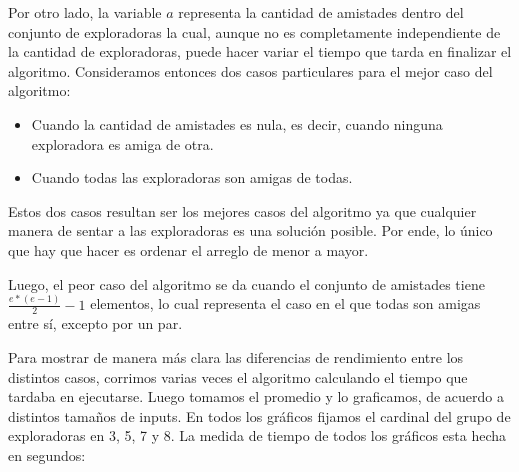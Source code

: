 \documentclass[11pt]{article}
\begin{document}
Por otro lado, la variable $a$ representa la cantidad de amistades dentro del conjunto de exploradoras la cual, 
aunque no es completamente independiente de la cantidad de exploradoras, puede hacer variar el tiempo que tarda 
en finalizar el algoritmo. Consideramos entonces dos casos particulares para el mejor caso del algoritmo:
\begin{itemize}
  \item Cuando la cantidad de amistades es nula, es decir, cuando ninguna exploradora es amiga de otra.
  \item Cuando todas las exploradoras son amigas de todas.
\end{itemize}
Estos dos casos resultan ser los mejores casos del algoritmo ya que cualquier manera de sentar a las exploradoras 
es una solución posible. Por ende, lo único que hay que hacer es ordenar el arreglo de menor a mayor. 

Luego, el peor caso del algoritmo se da cuando el conjunto de amistades tiene $\frac{e*(e-1)}{2} - 1$ elementos, 
lo cual representa el caso en el que todas son amigas entre sí, excepto por un par.

Para mostrar de manera más clara las diferencias de rendimiento entre los distintos casos, corrimos varias veces 
el algoritmo calculando el tiempo que tardaba en ejecutarse. Luego tomamos el promedio y lo graficamos, de acuerdo a distintos tamaños de inputs.
En todos los gráficos fijamos el cardinal del grupo de exploradoras en 3, 5, 7 y 8. La medida de tiempo de todos los gráficos esta hecha 
en segundos: 
\end{document}
